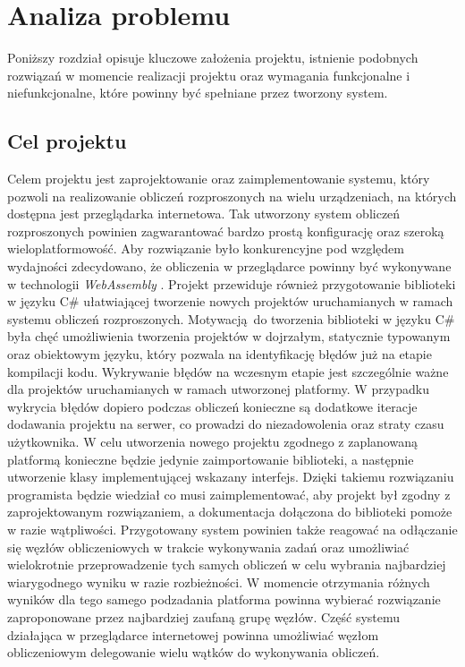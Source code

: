 \documentclass[a4paper,11pt,twoside]{report}
\theoremstyle{definition}
\begin{document}
\chapter{Analiza problemu}
    \label{analiza-problemu}

    Poniższy rozdział opisuje kluczowe założenia projektu, istnienie podobnych rozwiązań w momencie realizacji projektu oraz wymagania funkcjonalne i niefunkcjonalne, które powinny być spełniane przez tworzony system.

    \section{Cel projektu}
        Celem projektu jest zaprojektowanie oraz zaimplementowanie systemu, który pozwoli na realizowanie obliczeń rozproszonych na wielu urządzeniach, na których dostępna jest przeglądarka internetowa.
        Tak utworzony system obliczeń rozproszonych powinien zagwarantować bardzo prostą konfigurację oraz szeroką wieloplatformowość.
        Aby rozwiązanie było konkurencyjne pod względem wydajności zdecydowano, że obliczenia w przeglądarce powinny być wykonywane w technologii \textit{WebAssembly} \cite{webassembly}.
        Projekt przewiduje również przygotowanie biblioteki w języku C\# ułatwiającej tworzenie nowych projektów uruchamianych w ramach systemu obliczeń rozproszonych. 
        Motywacją do tworzenia biblioteki w języku C\# była chęć umożliwienia tworzenia projektów w dojrzałym, statycznie typowanym oraz obiektowym języku, który pozwala na identyfikację błędów już na etapie kompilacji kodu. 
        Wykrywanie błędów na wczesnym etapie jest szczególnie ważne dla projektów uruchamianych w ramach utworzonej platformy.
        W przypadku wykrycia błędów dopiero podczas obliczeń konieczne są dodatkowe iteracje dodawania projektu na serwer, co prowadzi do niezadowolenia oraz straty czasu użytkownika.
        W celu utworzenia nowego projektu zgodnego z zaplanowaną platformą konieczne będzie jedynie zaimportowanie biblioteki, a następnie utworzenie klasy implementującej wskazany interfejs.
        Dzięki takiemu rozwiązaniu programista będzie wiedział co musi zaimplementować, aby projekt był zgodny z zaprojektowanym rozwiązaniem, a dokumentacja dołączona do biblioteki pomoże w razie wątpliwości.
        Przygotowany system powinien także reagować na odłączanie się węzłów obliczeniowych w trakcie wykonywania zadań oraz umożliwiać wielokrotnie przeprowadzenie tych samych obliczeń w celu wybrania najbardziej wiarygodnego wyniku w razie rozbieżności.
        W momencie otrzymania różnych wyników dla tego samego podzadania platforma powinna wybierać rozwiązanie zaproponowane przez najbardziej zaufaną grupę węzłów.
        Część systemu działająca w przeglądarce internetowej powinna umożliwiać węzłom obliczeniowym delegowanie wielu wątków do wykonywania obliczeń.
    
\end{document}
